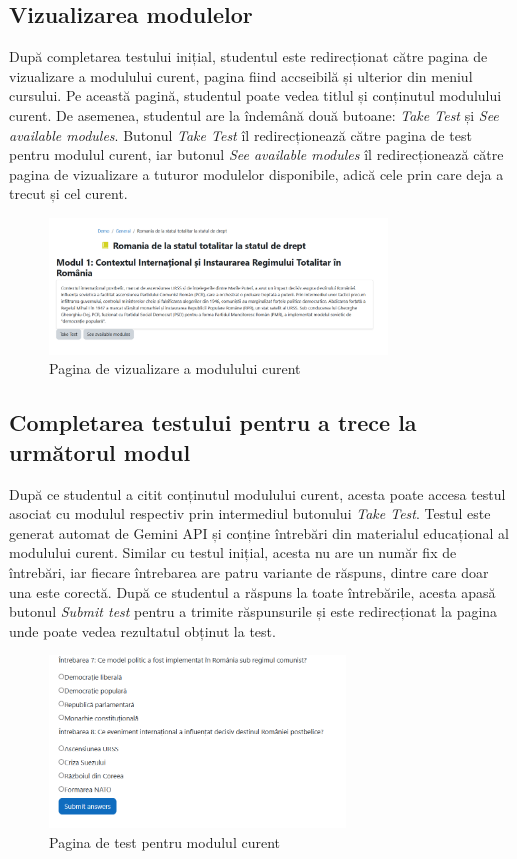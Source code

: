 \subsection{Vizualizarea modulelor}
După completarea testului inițial, studentul este redirecționat către pagina de vizualizare a modulului curent, pagina fiind accseibilă și ulterior din meniul cursului. Pe această pagină,
studentul poate vedea titlul și conținutul modulului curent. De asemenea, studentul are la îndemână două butoane: \textit{Take Test} și \textit{See available modules}. Butonul 
\textit{Take Test} îl redirecționează către pagina de test pentru modulul curent, iar butonul \textit{See available modules} îl redirecționează către pagina de vizualizare a tuturor
modulelor disponibile, adică cele prin care deja a trecut și cel curent.
\begin{figure}[H]
    \centering
    \includegraphics[width=0.8\textwidth]{images/learnPage.png}
    \caption{Pagina de vizualizare a modulului curent}
    \label{fig:vizualizare_modul_curent}
\end{figure}

\subsection{Completarea testului pentru a trece la următorul modul}
După ce studentul a citit conținutul modulului curent, acesta poate accesa testul asociat cu modulul respectiv prin intermediul butonului \textit{Take Test}. Testul este generat automat de 
Gemini API și conține întrebări din materialul educațional al modulului curent. Similar cu testul inițial, acesta nu are un număr fix de întrebări, iar fiecare întrebarea are patru variante 
de răspuns, dintre care doar una este corectă. După ce studentul a răspuns la toate întrebările, acesta apasă butonul \textit{Submit test} pentru a trimite răspunsurile și este redirecționat 
la pagina unde poate vedea rezultatul obținut la test.
\begin{figure}[H]
    \centering
    \includegraphics[width=0.7\textwidth]{images/testPage.png}
    \caption{Pagina de test pentru modulul curent}
    \label{fig:pagina_test_modul_curent}
\end{figure}

